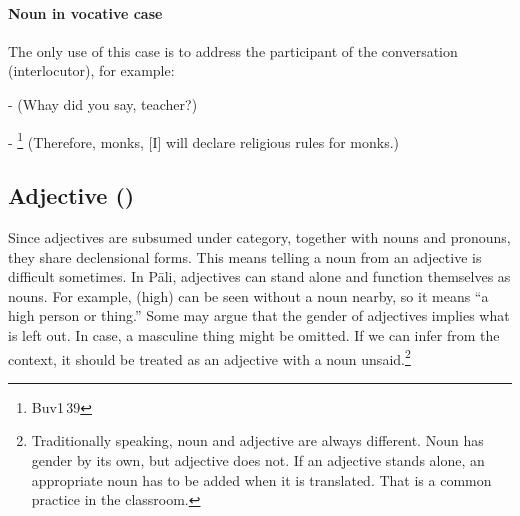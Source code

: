 \paragraph*{Noun in vocative case} The only use of this case is to address the participant of the conversation (interlocutor), for example:\par
-  (Whay did you say, teacher?)\par
- \footnote{Buv1\,39} (Therefore, monks, [I] will declare religious rules for monks.)\par

{}
\subsection*{Adjective ()} 

Since adjectives are subsumed under  category, together with nouns and pronouns, they share declensional forms. This means telling a noun from an adjective is difficult sometimes. In P\=ali, adjectives can stand alone and function themselves as nouns. For example,  (high) can be seen without a noun nearby, so it means ``a high person or thing.'' Some may argue that the gender of adjectives implies what is left out. In  case, a masculine thing might be omitted. If we can infer from the context, it should be treated as an adjective with a noun unsaid.\footnote{Traditionally speaking, noun and adjective are always different. Noun has gender by its own, but adjective does not. If an adjective stands alone, an appropriate noun has to be added when it is translated. That is a common practice in the classroom.}

